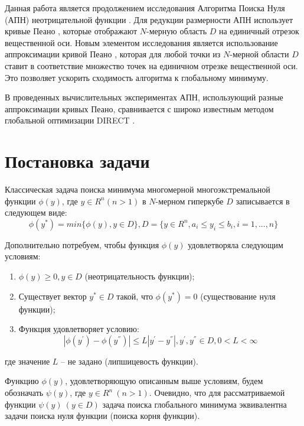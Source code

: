 \documentclass[11pt, oneside, a4paper]{article}
\begin{document}
Данная работа является продолжением исследования Алгоритма Поиска Нуля (АПН) неотрицательной функции \cite{Zaitsev,Barkalov2}. Для редукции размерности АПН использует кривые Пеано \cite{Strongin1,Strongin2}, которые отображают $N$-мерную область $D$ на единичный отрезок вещественной оси. Новым элементом исследования является использование аппроксимации кривой Пеано \cite{Sergeyev}, которая для любой точки из $N$-мерной области $D$ ставит в соответствие множество точек на единичном отрезке вещественной оси. Это позволяет ускорить сходимость алгоритма к глобальному минимуму.

В проведенных вычислительных экспериментах АПН, использующий разные аппроксимации кривых Пеано, сравнивается с широко известным методом глобальной оптимизации DIRECT \cite{Jones}.



\section{Постановка задачи}
Классическая задача поиска минимума многомерной многоэкстремальной функции $\phi(y)$, где $y\in R^{n} (n>1)$ в $N$-мерном гиперкубе $D$ записывается в следующем виде:
	\[
	\phi(y^{*})=min\{\phi(y),y\in D\}, D=\{y\in R^{n},a_{i}\leq y_{i}\leq b_{i}, i=1,...,n\} \tag{1}
	\]

Дополнительно потребуем, чтобы функция $\phi(y)$ удовлетворяла следующим условиям:
\begin{enumerate}
	\item $\phi(y)\geq 0, y\in D$ (неотрицательность функции);
  \item Существует вектор $y^{*}\in D$ такой, что $\phi(y^{*})=0$ (существование нуля функции);
	\item Функция удовлетворяет условию: \[\left|\phi(y^{'}) - \phi(y^{''}) \right| \leq L \left| y^{'} - y^{''} \right| ,y^{'},y^{''}\in D, 0<L<\infty\]
\end{enumerate}

где значение $L$ – не задано (липшицевость функции).

Функцию $\phi(y)$, удовлетворяющую описанным выше условиям, будем обозначать $\psi(y)$, где $y\in R^{n}\:(n>1)$. Очевидно, что для рассматриваемой функции $\psi(y)\:(y\in D)$ задача поиска глобального минимума эквивалентна задачи поиска нуля функции (поиска корня функции).
\end{document}
